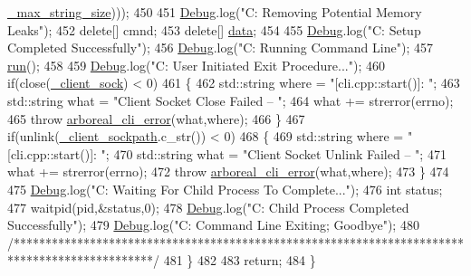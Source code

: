 \begin{DoxyCode}
      \mbox{\hyperlink{class_c_l_i_a13b5699d950ce765cad098f7613a3e20}{\_max\_string\_size}})));
450 
451     \mbox{\hyperlink{_cli_8h_ab6d95a4e6a59b4ad033ed3af31d878e0}{Debug}}.log(\textcolor{stringliteral}{"C: Removing Potential Memory Leaks"});
452     \textcolor{keyword}{delete}[] cmnd;
453     \textcolor{keyword}{delete}[] \mbox{\hyperlink{daemon_8h_a85eb9d2878279de5fcb3000467c81af7}{data}};
454 
455     \mbox{\hyperlink{_cli_8h_ab6d95a4e6a59b4ad033ed3af31d878e0}{Debug}}.log(\textcolor{stringliteral}{"C: Setup Completed Successfully"});
456     \mbox{\hyperlink{_cli_8h_ab6d95a4e6a59b4ad033ed3af31d878e0}{Debug}}.log(\textcolor{stringliteral}{"C: Running Command Line"});
457     \mbox{\hyperlink{class_c_l_i_aeefc8cd81999836a90c2cfaced6177f1}{run}}();
458 
459     \mbox{\hyperlink{_cli_8h_ab6d95a4e6a59b4ad033ed3af31d878e0}{Debug}}.log(\textcolor{stringliteral}{"C: User Initiated Exit Procedure..."});
460     \textcolor{keywordflow}{if}(close(\mbox{\hyperlink{class_c_l_i_a89c215687bff66a3e0359a17bac3657d}{\_client\_sock}}) < 0)
461     \{
462       std::string where = \textcolor{stringliteral}{"[cli.cpp::start()]: "};
463       std::string what = \textcolor{stringliteral}{"Client Socket Close Failed -- "};
464       what += strerror(errno);
465       \textcolor{keywordflow}{throw} \mbox{\hyperlink{classarboreal__cli__error}{arboreal\_cli\_error}}(what,where);
466     \}
467     \textcolor{keywordflow}{if}(unlink(\mbox{\hyperlink{class_c_l_i_ad3b7579608f8c2e1d4c01a8668f701d9}{\_client\_sockpath}}.c\_str()) < 0)
468     \{
469       std::string where = \textcolor{stringliteral}{"[cli.cpp::start()]: "};
470       std::string what = \textcolor{stringliteral}{"Client Socket Unlink Failed -- "};
471       what += strerror(errno);
472       \textcolor{keywordflow}{throw} \mbox{\hyperlink{classarboreal__cli__error}{arboreal\_cli\_error}}(what,where);
473     \}
474 
475     \mbox{\hyperlink{_cli_8h_ab6d95a4e6a59b4ad033ed3af31d878e0}{Debug}}.log(\textcolor{stringliteral}{"C: Waiting For Child Process To Complete..."});
476     \textcolor{keywordtype}{int} status;
477     waitpid(pid,&status,0);
478     \mbox{\hyperlink{_cli_8h_ab6d95a4e6a59b4ad033ed3af31d878e0}{Debug}}.log(\textcolor{stringliteral}{"C: Child Process Completed Successfully"});
479     \mbox{\hyperlink{_cli_8h_ab6d95a4e6a59b4ad033ed3af31d878e0}{Debug}}.log(\textcolor{stringliteral}{"C: Command Line Exiting; Goodbye"});
480     \textcolor{comment}{/**********************************************************************************************/}
481   \}
482 
483   \textcolor{keywordflow}{return};
484 \}
\end{DoxyCode}


